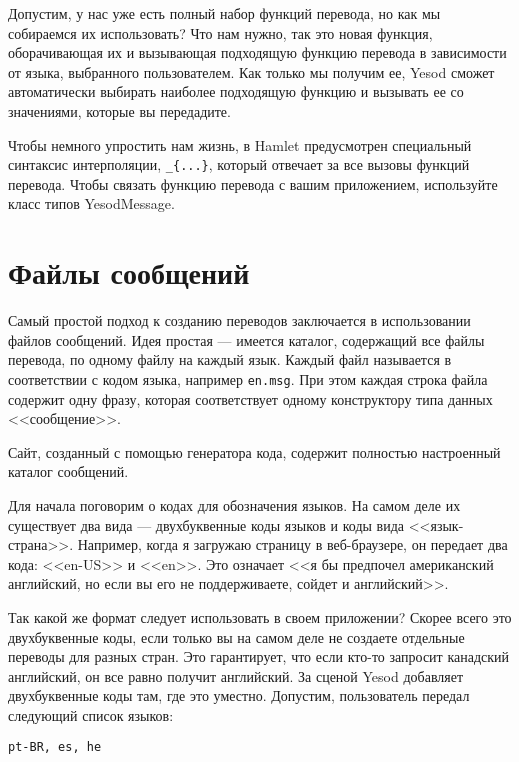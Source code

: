 Допустим, у нас уже есть полный набор функций перевода, но как мы собираемся их использовать? Что нам нужно, так это новая функция, оборачивающая их и вызывающая подходящую функцию перевода в зависимости от языка, выбранного пользователем. Как только мы получим ее, Yesod сможет автоматически выбирать наиболее подходящую функцию и вызывать ее со значениями, которые вы передадите.

Чтобы немного упростить нам жизнь, в Hamlet предусмотрен специальный синтаксис интерполяции, \lstinline'_{...}', который отвечает за все вызовы функций перевода. Чтобы связать функцию перевода с вашим приложением, используйте класс типов YesodMessage.

\section{Файлы сообщений} %

Самый простой подход к созданию переводов заключается в использовании файлов сообщений. Идея простая --- имеется каталог, содержащий все файлы перевода, по одному файлу на каждый язык. Каждый файл называется в соответствии с кодом языка, например \lstinline'en.msg'. При этом каждая строка файла содержит одну фразу, которая соответствует одному конструктору типа данных <<сообщение>>.

\begin{remark}
Сайт, созданный с помощью генератора кода, содержит полностью настроенный каталог сообщений. %
\end{remark}

Для начала поговорим о кодах для обозначения языков. На самом деле их существует два вида --- двухбуквенные коды языков и коды вида <<язык-страна>>. Например, когда я загружаю страницу в веб-браузере, он передает два кода: <<en-US>> и <<en>>. Это означает <<я бы предпочел американский английский, но если вы его не поддерживаете, сойдет и английский>>.

Так какой же формат следует использовать в своем приложении? Скорее всего это двухбуквенные коды, если только вы на самом деле не создаете отдельные переводы для разных стран. Это гарантирует, что если кто-то запросит канадский английский, он все равно получит английский. За сценой Yesod добавляет двухбуквенные коды там, где это уместно. Допустим, пользователь передал следующий список языков:

\begin{lstlisting}
pt-BR, es, he
\end{lstlisting}

